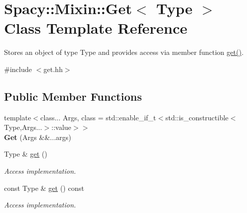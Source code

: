 \hypertarget{classSpacy_1_1Mixin_1_1Get}{}\section{Spacy\+:\+:Mixin\+:\+:Get$<$ Type $>$ Class Template Reference}
\label{classSpacy_1_1Mixin_1_1Get}


Stores an object of type Type and provides access via member function \hyperlink{classSpacy_1_1Mixin_1_1Get_aaa3afedcb9b9e943f81d1686b70417db}{get()}.  




{\ttfamily \#include $<$get.\+hh$>$}

\subsection*{Public Member Functions}
\begin{DoxyCompactItemize}
\item 
{\footnotesize template$<$class... Args, class  = std\+::enable\+\_\+if\+\_\+t$<$std\+::is\+\_\+constructible$<$\+Type,\+Args...$>$\+::value$>$$>$ }\\{\bfseries Get} (Args \&\&...args)\hypertarget{classSpacy_1_1Mixin_1_1Get_ac41e0114cae0c69d1bdce9f44693a90c}{}\label{classSpacy_1_1Mixin_1_1Get_ac41e0114cae0c69d1bdce9f44693a90c}

\item 
Type \& \hyperlink{classSpacy_1_1Mixin_1_1Get_aaa3afedcb9b9e943f81d1686b70417db}{get} ()\hypertarget{classSpacy_1_1Mixin_1_1Get_aaa3afedcb9b9e943f81d1686b70417db}{}\label{classSpacy_1_1Mixin_1_1Get_aaa3afedcb9b9e943f81d1686b70417db}

\begin{DoxyCompactList}\small\item\em Access implementation. \end{DoxyCompactList}\item 
const Type \& \hyperlink{classSpacy_1_1Mixin_1_1Get_ab00e550fb3ac8208d0a25e17e705a9fc}{get} () const \hypertarget{classSpacy_1_1Mixin_1_1Get_ab00e550fb3ac8208d0a25e17e705a9fc}{}\label{classSpacy_1_1Mixin_1_1Get_ab00e550fb3ac8208d0a25e17e705a9fc}

\begin{DoxyCompactList}\small\item\em Access implementation. \end{DoxyCompactList}\end{DoxyCompactItemize}


